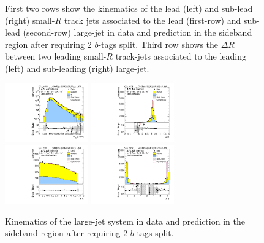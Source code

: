 \begin{figure}[htbp!]
\begin{center}
  \caption{First two rows show the kinematics of the lead (left) and sub-lead (right) small-$R$ track jets associated to the lead (first-row) and sub-lead (second-row) large-\R jet in data and prediction in the sideband region after requiring 2 $b$-tags split. Third row shows the $\Delta R$ between two leading small-$R$ track-jets associated to the leading (left) and sub-leading (right) large-\R jet. }
  \label{fig:boosted-2bs-sideband-ak2}
\end{center}
\end{figure}


\begin{figure}[htbp!]
\begin{center}
\includegraphics[width=0.32\textwidth,angle=-90]{figures/boosted/Sideband/b77_TwoTag_split_Sideband_mHH_l_1.pdf}
\includegraphics[width=0.32\textwidth,angle=-90]{figures/boosted/Sideband/b77_TwoTag_split_Sideband_hCandDr.pdf}\\
\includegraphics[width=0.32\textwidth,angle=-90]{figures/boosted/Sideband/b77_TwoTag_split_Sideband_hCandDeta.pdf}
\includegraphics[width=0.32\textwidth,angle=-90]{figures/boosted/Sideband/b77_TwoTag_split_Sideband_hCandDphi.pdf}
  \caption{Kinematics of the large-\R jet system in data and prediction in the sideband region after requiring 2 $b$-tags split. }
  \label{fig:boosted-2bs-sideband-ak10-system}
\end{center}
\end{figure}

\clearpage
